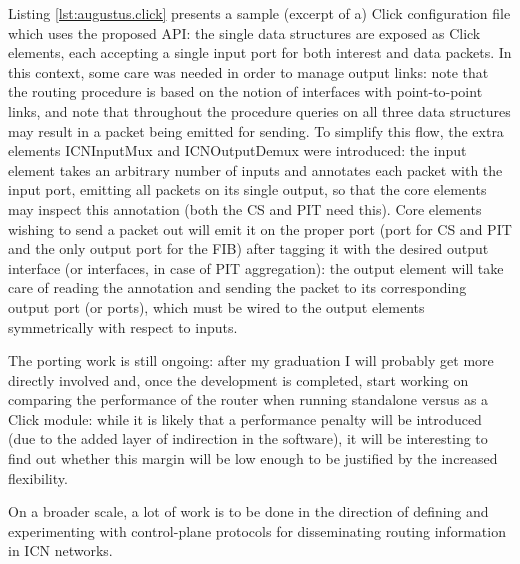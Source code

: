 \documentclass[11pt,a4paper,twoside,titlepage,openany]{book}
\newcommand{\mono}[1]{{\footnotesize \ttfamily #1}}
\begin{document}
Listing \ref{lst:augustus.click} presents a sample (excerpt of a) Click configuration file which uses the proposed API: the single data structures are exposed as Click elements, each accepting a single input port for both interest and data packets. In this context, some care was needed in order to manage output links: note that the routing procedure is based on the notion of interfaces with point-to-point links, and note that throughout the procedure queries on all three data structures may result in a packet being emitted for sending. To simplify this flow, the extra elements \mono{ICNInputMux} and \mono{ICNOutputDemux} were introduced: the input element takes an arbitrary number of inputs and annotates each packet with the input port, emitting all packets on its single output, so that the core elements may inspect this annotation (both the CS and PIT need this). Core elements wishing to send a packet out will emit it on the proper port (port \mono{[1]} for CS and PIT and the only output port for the FIB) after tagging it with the desired output interface (or interfaces, in case of PIT aggregation): the output element will take care of reading the annotation and sending the packet to its corresponding output port (or ports), which must be wired to the output elements symmetrically with respect to inputs.

The porting work is still ongoing: after my graduation I will probably get more directly involved and, once the development is completed, start working on comparing the performance of the router when running standalone versus as a Click module: while it is likely that a performance penalty will be introduced (due to the added layer of indirection in the software), it will be interesting to find out whether this margin will be low enough to be justified by the increased flexibility.

\todo[inline]{}
On a broader scale, a lot of work is to be done in the direction of defining and experimenting with control-plane protocols for disseminating routing information in \gls{ICN} networks.
\end{document}
